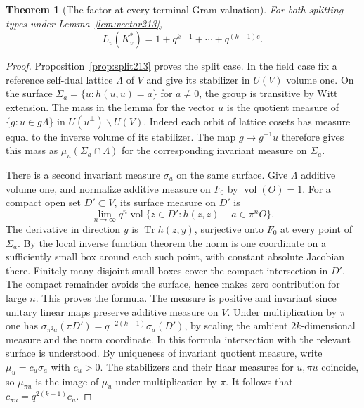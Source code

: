 \documentclass[a4paper,11pt]{article}
\newtheorem{theorem}[proposition]{Theorem}
\theoremstyle{definition}
\theoremstyle{remark}
\numberwithin{equation}{section}
\begin{document}
\begin{theorem}[The factor at every terminal Gram valuation]
\label{thm:local213}
For both splitting types under Lemma~\ref{lem:vector213},
\begin{equation}
                     L_v(K_v^*)=1+q^{k-1}+\cdots+q^{(k-1)e}.
                                                      \label{eq:local213}
\end{equation}
\end{theorem}
\begin{proof}
Proposition~\ref{prop:split213} proves the split case. In the
field case fix a reference self-dual lattice \(\Lambda\) of \(V\)
and give its stabilizer in \(U(V)\) volume one. On the surface
\(\Sigma_a=\{u:h(u,u)=a\}\) for \(a\ne0\), the group is transitive
by Witt extension. The mass in the lemma for the vector \(u\) is
the quotient measure of \(\{g:u\in g\Lambda\}\) in
\(U(u^\perp)\backslash U(V)\). Indeed each orbit of lattice
cosets has measure equal to the inverse volume of its stabilizer.
The map \(g\mapsto g^{-1}u\) therefore gives this mass as
\(\mu_u(\Sigma_a\cap\Lambda)\) for the corresponding invariant
measure on \(\Sigma_a\).

There is a second invariant measure \(\sigma_a\) on the same
surface. Give \(\Lambda\) additive volume one, and normalize
additive measure on \(F_0\) by \(\operatorname{vol}(O)=1\).
For a compact open set \(D'\subset V\), its surface measure on
\(D'\) is
\[
 \lim_{n\to\infty} q^n\operatorname{vol}
 \{z\in D':h(z,z)-a\in\pi^nO\}.
\]
The derivative in direction \(y\) is \(\operatorname{Tr}h(z,y)\),
surjective onto \(F_0\) at every point of \(\Sigma_a\).
By the local inverse function theorem the norm is one coordinate
on a sufficiently small box around each such point, with constant
absolute Jacobian there. Finitely many disjoint small boxes cover
the compact intersection in \(D'\). The compact remainder avoids
the surface, hence makes zero contribution for large \(n\).
This proves the formula. The measure is positive and invariant
since unitary linear maps preserve additive measure on \(V\).
Under multiplication by \(\pi\) one has
\(\sigma_{\pi^2 a}(\pi D')=q^{-2(k-1)}\sigma_a(D')\), by scaling
the ambient \(2k\)-dimensional measure and the norm coordinate.
In this formula intersection with the relevant surface is understood.
By uniqueness of invariant quotient measure, write
\(\mu_u=c_u\sigma_a\) with \(c_u>0\). The stabilizers and their
Haar measures for \(u,\pi u\) coincide, so \(\mu_{\pi u}\)
is the image of \(\mu_u\) under multiplication by \(\pi\).
It follows that \(c_{\pi u}=q^{2(k-1)}c_u\).


\end{proof}
\end{document}
